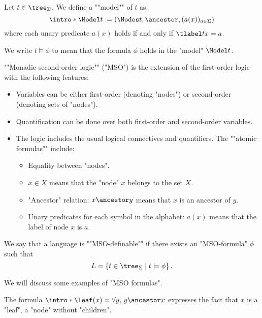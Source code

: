 \documentclass[a4paper,UKenglish,cleveref, autoref, thm-restate]{lipics-v2021}
\begin{document}
\begin{definition}
	\AP Let $t \in \tree_{\Sigma}$. We define a ""model"" of $t$ as:
	\[
		\intro* \Model t := (\Nodes t, \ancestor , (a (x))_{a \in \Sigma})
	\]
	where each unary predicate $a(x)$ holds if and only if $\tlabel t x = a $.

	We write $t \models \phi$ to mean that the formula $\phi$ holds in the "model" $\Model t$.
\end{definition}

\begin{definition}
	\AP ""Monadic second-order logic"" (\reintro*"MSO") is the extension of the first-order logic with the following features:
	\begin{itemize}
		\item Variables can be either first-order (denoting "nodes") or second-order (denoting sets of "nodes").
		\item Quantification can be done over both first-order and second-order variables.
		\item The logic includes the usual logical connectives and quantifiers.
		      \itemAP The ""atomic formulas"" include:
		      \begin{itemize}
			      \item Equality between "nodes".
			      \item $x \in X$ means that the "node" $x$ belongs to the set $X$.
			      \item "Ancestor" relation: \( x \ancestor y \) means that \( x \) is an ancestor of \( y \).
			      \item Unary predicates for each symbol in the alphabet: \( a(x) \) means that the label of node \( x \) is \( a \).
		      \end{itemize}
	\end{itemize}
\end{definition}

\begin{definition}
	\AP We say that a language is ""MSO-definable"" if there exists an "MSO-formula" \( \phi \) such that
	\[
		L = \setdef{t \in \tree_{\Sigma}}{t \models \phi}.
	\]
\end{definition}


We will discuss some examples of "MSO formulas".

\begin{example}
	\AP The formula $\intro* \leaf(x) = \forall y,\, y \ancestor x$ expresses the fact that $x$ is a "leaf",
	a "node" without "children".
\end{example}
\end{document}
